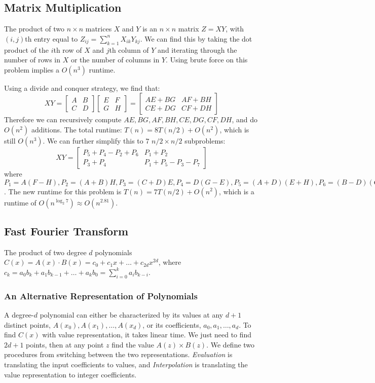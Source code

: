 \subsection{Matrix Multiplication}
The product of two $n \times n$ matrices $X$ and $Y$ is an $n \times n$ matrix $Z = XY$, with $(i, j)$th entry equal to $Z_{ij} = \sum_{k=1}^n X_{ik} Y_{kj}$. We can find this by taking the dot product of the $i$th row of $X$ and $j$th column of $Y$ and iterating through the number of rows in $X$ or the number of columns in $Y$. Using brute force on this problem implies a $O(n^3)$ runtime. \par
Using a divide and conquer strategy, we find that:
\[XY = \begin{bmatrix}A & B \\ C & D\end{bmatrix}\begin{bmatrix}E & F \\ G & H\end{bmatrix} = \begin{bmatrix}AE+BG & AF+BH \\ CE+DG & CF+DH\end{bmatrix}\]
Therefore we can recursively compute $AE, BG, AF, BH, CE, DG, CF, DH$, and do $O(n^2)$ additions.
The total runtime: $T(n) = 8T(n/2) + O(n^2)$, which is still $O(n^3)$.
We can further simplify this to $7$ $n/2 \times n/2$ subproblems:
\[XY = \begin{bmatrix} P_5 + P_4 - P_2 + P_6 & P_1 + P_2 \\ P_3 + P_4 & P_1 + P_5 - P_3 - P_7 \end{bmatrix}\]
where $P_1 = A(F - H), P_2 = (A+B)H, P_3 = (C+D)E, P_4 = D(G - E), P_5 = (A + D)(E + H), P_6 = (B-D)(G+H), P_7 = (A-C)(E+F)$. The new runtime for this problem is $T(n) = 7T(n/2) + O(n^2)$, which is a runtime of $O(n^{\log_2 7}) \approx O(n^{2.81})$.

\subsection{Fast Fourier Transform}
The product of two degree $d$ polynomials $C(x) = A(x) \cdot B(x) = c_0 + c_1x + \dots + c_{2d}x^{2d}$, where $c_k = a_0 b_k + a_1 b_{k-1} + \dots + a_k b_0 = \sum_{i=0}^k a_i b_{k-i}$.
\subsubsection{An Alternative Representation of Polynomials}
A degree-$d$ polynomial can either be characterized by its values at any $d+1$ distinct points, $A(x_0), A(x_1), \dots, A(x_d)$, or its coefficients, $a_0, a_1, \dots, a_d$.
To find $C(x)$ with value representation, it takes linear time. We just need to find $2d+1$ points, then at any point $z$ find the value $A(z) \times B(z)$.
We define two procedures from switching between the two representations.
\emph{Evaluation} is translating the input coefficients to values, and \emph{Interpolation} is translating the value representation to integer coefficients.


